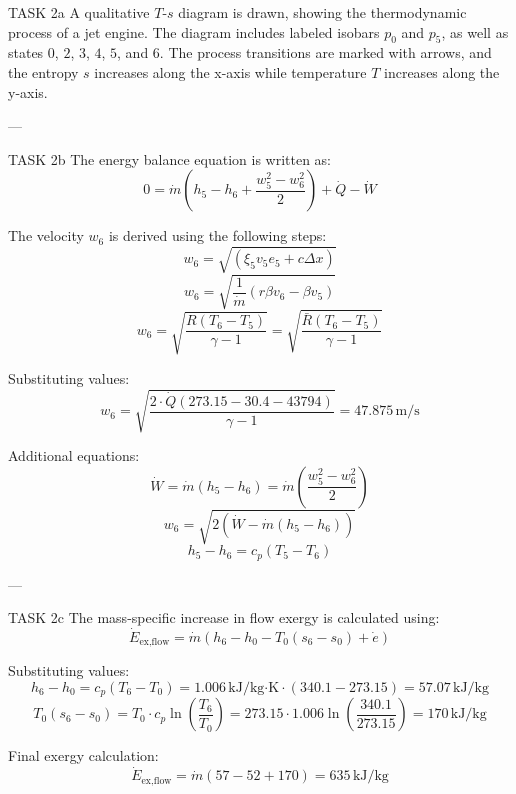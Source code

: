 TASK 2a  
A qualitative \( T \)-\( s \) diagram is drawn, showing the thermodynamic process of a jet engine. The diagram includes labeled isobars \( p_0 \) and \( p_5 \), as well as states \( 0 \), \( 2 \), \( 3 \), \( 4 \), \( 5 \), and \( 6 \). The process transitions are marked with arrows, and the entropy \( s \) increases along the x-axis while temperature \( T \) increases along the y-axis.  

---

TASK 2b  
The energy balance equation is written as:  
\[
0 = \dot{m} \left( h_5 - h_6 + \frac{w_5^2 - w_6^2}{2} \right) + \dot{Q} - \dot{W}
\]  

The velocity \( w_6 \) is derived using the following steps:  
\[
w_6 = \sqrt{\left( \xi_5 v_5 e_5 + c \Delta x \right)}  
\]  
\[
w_6 = \sqrt{\frac{1}{\dot{m}} \left( r \beta v_6 - \beta v_5 \right)}  
\]  
\[
w_6 = \sqrt{\frac{R \left( T_6 - T_5 \right)}{\gamma - 1}} = \sqrt{\frac{\bar{R} \left( T_6 - T_5 \right)}{\gamma - 1}}
\]  

Substituting values:  
\[
w_6 = \sqrt{\frac{2 \cdot \dot{Q} \left( 273.15 - 30.4 - 43794 \right)}{\gamma - 1}} = 47.875 \, \text{m/s}
\]  

Additional equations:  
\[
\dot{W} = \dot{m} \left( h_5 - h_6 \right) = \dot{m} \left( \frac{w_5^2 - w_6^2}{2} \right)
\]  
\[
w_6 = \sqrt{2 \left( \dot{W} - \dot{m} \left( h_5 - h_6 \right) \right)}
\]  
\[
h_5 - h_6 = c_p \left( T_5 - T_6 \right)
\]  

---

TASK 2c  
The mass-specific increase in flow exergy is calculated using:  
\[
\dot{E}_{\text{ex,flow}} = \dot{m} \left( h_6 - h_0 - T_0 \left( s_6 - s_0 \right) + \dot{e} \right)
\]  

Substituting values:  
\[
h_6 - h_0 = c_p \left( T_6 - T_0 \right) = 1.006 \, \text{kJ/kg·K} \cdot \left( 340.1 - 273.15 \right) = 57.07 \, \text{kJ/kg}
\]  
\[
T_0 \left( s_6 - s_0 \right) = T_0 \cdot c_p \ln \left( \frac{T_6}{T_0} \right) = 273.15 \cdot 1.006 \ln \left( \frac{340.1}{273.15} \right) = 170 \, \text{kJ/kg}
\]  

Final exergy calculation:  
\[
\dot{E}_{\text{ex,flow}} = \dot{m} \left( 57 - 52 + 170 \right) = 635 \, \text{kJ/kg}
\]